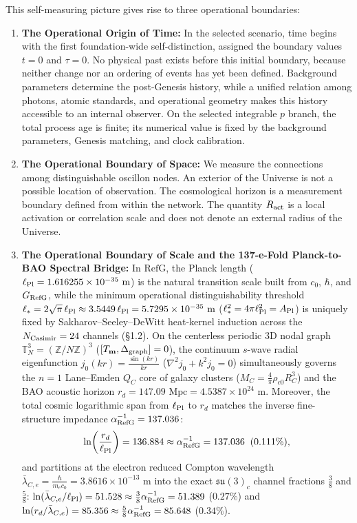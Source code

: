 \documentclass[11pt,a4paper]{article}
\newcommand{\RefG}{\mathrm{RefG}}
\begin{document}
This self-measuring picture gives rise to three operational boundaries:
\begin{enumerate}[label=\arabic*.]
\item \textbf{The Operational Origin of Time:} In the selected scenario, time begins with the first foundation-wide self-distinction, assigned the boundary values $t=0$ and $\tau=0$. No physical past exists before this initial boundary, because neither change nor an ordering of events has yet been defined. Background parameters determine the post-Genesis history, while a unified relation among photons, atomic standards, and operational geometry makes this history accessible to an internal observer. On the selected integrable $p$ branch, the total process age is finite; its numerical value is fixed by the background parameters, Genesis matching, and clock calibration.
\item \textbf{The Operational Boundary of Space:} We measure the connections among distinguishable oscillon nodes. An exterior of the Universe is not a possible location of observation. The cosmological horizon is a measurement boundary defined from within the network. The quantity $R_{\rm act}$ is a local activation or correlation scale and does not denote an external radius of the Universe.
\item \textbf{The Operational Boundary of Scale and the 137-e-Fold Planck-to-BAO Spectral Bridge:} In $\RefG$, the Planck length ($\ell_{\rm Pl} = 1.616255\times 10^{-35}\text{ m}$) is the natural transition scale built from $c_0$, $\hbar$, and $G_{\rm RefG}$, while the minimum operational distinguishability threshold $\ell_* = 2\sqrt{\pi}\,\ell_{\rm Pl} \approx 3.5449\,\ell_{\rm Pl} = 5.7295\times 10^{-35}\text{ m}$ ($\ell_*^2 = 4\pi\ell_{\rm Pl}^2 = A_{\rm Pl}$) is uniquely fixed by Sakharov--Seeley--DeWitt heat-kernel induction across the $N_{\rm Casimir} = 24$ channels (\S 1.2). On the centerless periodic 3D nodal graph $\mathbb{T}^3_N = (\mathbb{Z}/N\mathbb{Z})^3$ ($[T_{\mathbf{m}}, \Delta_{\rm graph}] = 0$), the continuum $s$-wave radial eigenfunction $j_0(kr) = \frac{\sin(kr)}{kr}$ ($\nabla^2 j_0 + k^2 j_0 = 0$) simultaneously governs the $n=1$ Lane--Emden $Q_C$ core of galaxy clusters ($M_C = \frac{4}{\pi}\rho_{c0}R_C^3$) and the BAO acoustic horizon $r_d = 147.09\text{ Mpc} = 4.5387\times 10^{24}\text{ m}$. Moreover, the total cosmic logarithmic span from $\ell_{\rm Pl}$ to $r_d$ matches the inverse fine-structure impedance $\alpha_{\rm RefG}^{-1} = 137.036$:
\begin{equation}
\ln\!\left(\frac{r_d}{\ell_{\rm Pl}}\right) = 136.884 \approx \alpha_{\rm RefG}^{-1} = 137.036 \;\;(0.111\%),
\end{equation}
and partitions at the electron reduced Compton wavelength $\bar{\lambda}_{C,e} = \frac{\hbar}{m_e c_0} = 3.8616\times 10^{-13}\text{ m}$ into the exact $\mathfrak{su}(3)_c$ channel fractions $\frac{3}{8}$ and $\frac{5}{8}$: $\ln(\bar{\lambda}_{C,e}/\ell_{\rm Pl}) = 51.528 \approx \frac{3}{8}\alpha_{\rm RefG}^{-1} = 51.389$ ($0.27\%$) and $\ln(r_d/\bar{\lambda}_{C,e}) = 85.356 \approx \frac{5}{8}\alpha_{\rm RefG}^{-1} = 85.648$ ($0.34\%$).
\end{enumerate}
\end{document}

